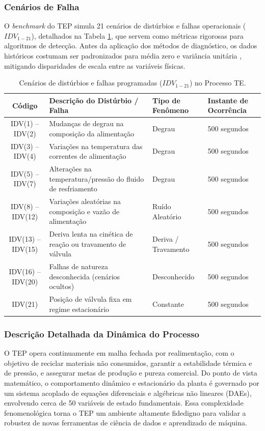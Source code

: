 \documentclass[journal]{IEEEtran}
\begin{document}
\subsubsection{Cenários de Falha}

O \textit{benchmark} do TEP simula 21 cenários de distúrbios e falhas operacionais ($IDV_{1-21}$), detalhados na Tabela \ref{tab:tep_faults}, que servem como métricas rigorosas para algoritmos de detecção. Antes da aplicação dos métodos de diagnóstico, os dados históricos costumam ser padronizados para média zero e variância unitária \cite{yin2012}, mitigando disparidades de escala entre as variáveis físicas.

\begin{table}[!ht]
\centering
\caption{Cenários de distúrbios e falhas programadas ($IDV_{1-21}$) no Processo TE.}
\label{tab:tep_faults}
\small
\begin{tabular}{cllp{4.5cm}}
\toprule
\rowcolor{gray!20}
\textbf{Código} & \textbf{Descrição do Distúrbio / Falha} & \textbf{Tipo de Fenômeno} & \textbf{Instante de Ocorrência} \\
\midrule
IDV(1) -- IDV(2) & Mudanças de degrau na composição da alimentação & Degrau & 500 segundos \\
IDV(3) -- IDV(4) & Variações na temperatura das correntes de alimentação & Degrau & 500 segundos \\
IDV(5) -- IDV(7) & Alterações na temperatura/pressão do fluido de resfriamento & Degrau & 500 segundos \\
IDV(8) -- IDV(12) & Variações aleatórias na composição e vazão de alimentação & Ruído Aleatório & 500 segundos \\
IDV(13) -- IDV(15) & Deriva lenta na cinética de reação ou travamento de válvula & Deriva / Travamento & 500 segundos \\
IDV(16) -- IDV(20) & Falhas de natureza desconhecida (cenários ocultos) & Desconhecido & 500 segundos \\
IDV(21) & Posição de válvula fixa em regime estacionário & Constante & 500 segundos \\
\bottomrule
\end{tabular}
\end{table}

\subsubsection{Descrição Detalhada da Dinâmica do Processo}

O TEP opera continuamente em malha fechada por realimentação, com o objetivo de reciclar materiais não consumidos, garantir a estabilidade térmica e de pressão, e assegurar metas de produção e pureza comercial. Do ponto de vista matemático, o comportamento dinâmico e estacionário da planta é governado por um sistema acoplado de equações diferenciais e algébricas não lineares (DAEs), envolvendo cerca de 50 variáveis de estado fundamentais. Essa complexidade fenomenológica torna o TEP um ambiente altamente fidedigno para validar a robustez de novas ferramentas de ciência de dados e aprendizado de máquina.
\end{document}
